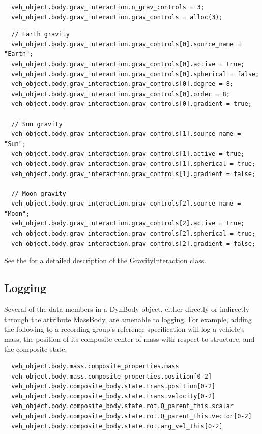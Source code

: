 \begin{verbatim}
  veh_object.body.grav_interaction.n_grav_controls = 3;
  veh_object.body.grav_interaction.grav_controls = alloc(3);
  \end{verbatim}
\clearpage
\begin{verbatim}
  // Earth gravity
  veh_object.body.grav_interaction.grav_controls[0].source_name = "Earth";
  veh_object.body.grav_interaction.grav_controls[0].active = true;
  veh_object.body.grav_interaction.grav_controls[0].spherical = false;
  veh_object.body.grav_interaction.grav_controls[0].degree = 8;
  veh_object.body.grav_interaction.grav_controls[0].order = 8;
  veh_object.body.grav_interaction.grav_controls[0].gradient = true;

  // Sun gravity
  veh_object.body.grav_interaction.grav_controls[1].source_name = "Sun";
  veh_object.body.grav_interaction.grav_controls[1].active = true;
  veh_object.body.grav_interaction.grav_controls[1].spherical = true;
  veh_object.body.grav_interaction.grav_controls[1].gradient = false;

  // Moon gravity
  veh_object.body.grav_interaction.grav_controls[2].source_name = "Moon";
  veh_object.body.grav_interaction.grav_controls[2].active = true;
  veh_object.body.grav_interaction.grav_controls[2].spherical = true;
  veh_object.body.grav_interaction.grav_controls[2].gradient = false;
\end{verbatim}

See the  for a detailed description of the
GravityInteraction class.

\subsection{Logging}
Several of the data members in a DynBody object, either directly or
indirectly through the attribute MassBody, are amenable to logging. For example,
adding the following to a recording group's reference specification
will log a vehicle's mass, the position of its composite center of mass
with respect to structure, and the composite state:

\begin{verbatim}
  veh_object.body.mass.composite_properties.mass
  veh_object.body.mass.composite_properties.position[0-2]
  veh_object.body.composite_body.state.trans.position[0-2]
  veh_object.body.composite_body.state.trans.velocity[0-2]
  veh_object.body.composite_body.state.rot.Q_parent_this.scalar
  veh_object.body.composite_body.state.rot.Q_parent_this.vector[0-2]
  veh_object.body.composite_body.state.rot.ang_vel_this[0-2]
\end{verbatim}


